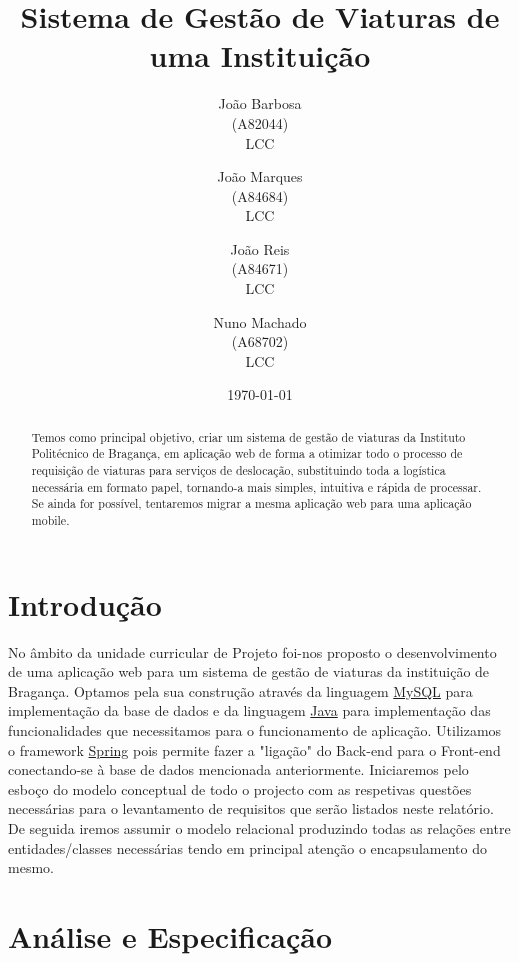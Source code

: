 \documentclass[11pt,a4paper]{report}%
\title{Sistema de Gestão de Viaturas de uma Instituição\\} %
\author{João Barbosa \\(A82044) \\LCC \and João Marques\\(A84684) \\LCC \and João Reis \\(A84671) \\LCC \and Nuno Machado \\(A68702) \\LCC}
\date{\today} %
\begin{document}
\maketitle %

\begin{abstract}  %
Temos como principal objetivo, criar um sistema de gestão de viaturas da Instituto Politécnico de Bragança, em aplicação web de forma a otimizar todo o processo de requisição de viaturas para serviços de deslocação, substituindo toda a logística necessária em formato papel, tornando-a mais simples, intuitiva e rápida de processar. Se ainda for possível, tentaremos migrar a mesma aplicação web para uma aplicação mobile. 
\end{abstract}

\tableofcontents %

\chapter{Introdução} \label{chap:intro} %

No âmbito da unidade curricular de Projeto foi-nos proposto o desenvolvimento de uma aplicação web para um sistema de gestão de viaturas da instituição de Bragança.
Optamos pela sua construção através da linguagem \href{https://www.mysql.com/}{MySQL} para implementação da base de dados e da linguagem \href{https://www.java.com/pt-BR/download/help/whatis_java.html}{Java} para implementação das funcionalidades que necessitamos para o funcionamento de aplicação. 
Utilizamos o framework \href{https://spring.io/}{Spring} pois permite fazer a "ligação" do Back-end para o Front-end conectando-se à base de dados mencionada anteriormente. 
Iniciaremos pelo esboço do modelo conceptual de todo o projecto com as respetivas questões necessárias para o levantamento de requisitos que serão listados neste relatório. De seguida iremos assumir o modelo relacional produzindo todas as relações entre entidades/classes necessárias tendo em principal atenção o encapsulamento do mesmo.

\newpage

\chapter{Análise e Especificação} 
\end{document}
